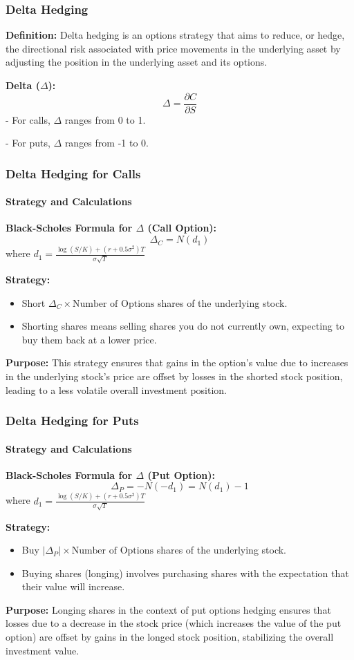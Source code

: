 \documentclass{beamer}
\begin{document}
\begin{frame}
\frametitle{Delta Hedging}

\textbf{Definition:} Delta hedging is an options strategy that aims to reduce, or hedge, the directional risk associated with price movements in the underlying asset by adjusting the position in the underlying asset and its options.

\textbf{Delta ($\Delta$):}
\[ \Delta = \frac{\partial C}{\partial S} \]
- For calls, $\Delta$ ranges from 0 to 1.

- For puts, $\Delta$ ranges from -1 to 0.

\end{frame}

\begin{frame}
\frametitle{Delta Hedging for Calls}
\framesubtitle{Strategy and Calculations}

\textbf{Black-Scholes Formula for $\Delta$ (Call Option):}
\[ \Delta_C = N(d_1) \]
where \( d_1 = \frac{\log(S/K) + (r + 0.5 \sigma^2) T}{\sigma \sqrt{T}} \)

\textbf{Strategy:}
\begin{itemize}
  \item Short $\Delta_C \times \text{Number of Options}$ shares of the underlying stock.
  \item Shorting shares means selling shares you do not currently own, expecting to buy them back at a lower price.
\end{itemize}

\textbf{Purpose:}
This strategy ensures that gains in the option's value due to increases in the underlying stock's price are offset by losses in the shorted stock position, leading to a less volatile overall investment position.

\end{frame}

\begin{frame}
\frametitle{Delta Hedging for Puts}
\framesubtitle{Strategy and Calculations}

\textbf{Black-Scholes Formula for $\Delta$ (Put Option):}
\[ \Delta_P = -N(-d_1) = N(d_1) - 1 \]
where \( d_1 = \frac{\log(S/K) + (r + 0.5 \sigma^2) T}{\sigma \sqrt{T}} \)

\textbf{Strategy:}
\begin{itemize}
  \item Buy $\left| \Delta_P \right| \times \text{Number of Options}$ shares of the underlying stock.
  \item Buying shares (longing) involves purchasing shares with the expectation that their value will increase.
\end{itemize}

\textbf{Purpose:}
Longing shares in the context of put options hedging ensures that losses due to a decrease in the stock price (which increases the value of the put option) are offset by gains in the longed stock position, stabilizing the overall investment value.

\end{frame}
\end{document}
